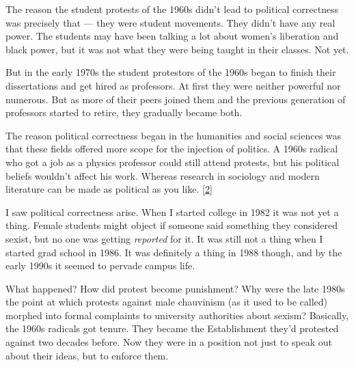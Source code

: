 The reason the student protests of the 1960s
                  didn't lead to political correctness was precisely that
                  --- they were student movements. They didn't have any real
                  power. The students may have been talking a lot about women's
                  liberation and black power, but it was not what they were
                  being taught in their classes. Not yet.

But in the
                  early 1970s the student protestors of the 1960s began to
                  finish their dissertations and get hired as professors. At
                  first they were neither powerful nor numerous. But as more of
                  their peers joined them and the previous generation of
                  professors started to retire, they gradually became both.

The
                  reason political correctness began in the humanities and
                  social sciences was that these fields offered more scope for
                  the injection of politics. A 1960s radical who got a job as a
                  physics professor could still attend protests, but his
                  political beliefs wouldn't affect his work. Whereas research
                  in sociology and modern literature can be made as political as
                  you like.
                  [\href{\#f2n}{2}]

I saw political correctness arise. When I started
                  college in 1982 it was not yet a thing. Female students might
                  object if someone said something they considered sexist, but
                  no one was getting \emph{reported} for it. It was still not a
                  thing when I started grad school in 1986. It was definitely a
                  thing in 1988 though, and by the early 1990s it seemed to
                  pervade campus life.

What happened? How did protest
                  become punishment? Why were the late 1980s the point at which
                  protests against male chauvinism (as it used to be called)
                  morphed into formal complaints to university authorities about
                  sexism? Basically, the 1960s radicals got tenure. They became
                  the Establishment they'd protested against two decades before.
                  Now they were in a position not just to speak out about their
                  ideas, but to enforce them.

